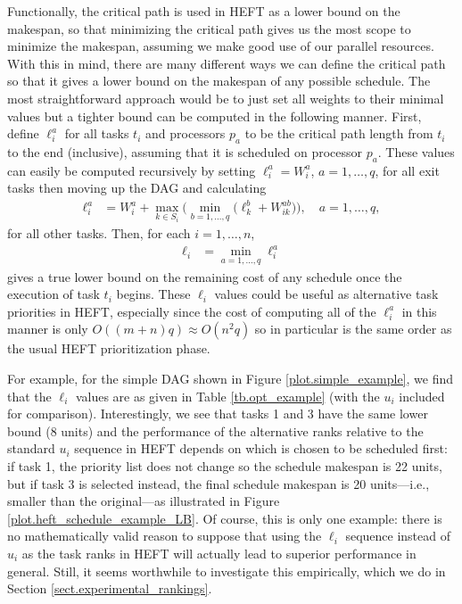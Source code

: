 \documentclass[12pt]{article}
\begin{document}
Functionally, the critical path is used in HEFT as a lower bound on the makespan, so that minimizing the critical path gives us the most scope to minimize the makespan, assuming we make good use of our parallel resources. With this in mind, there are many different ways we can define the critical path so that it gives a lower bound on the makespan of any possible schedule. The most straightforward approach would be to just set all weights to their minimal values but a tighter bound can be computed in the following manner. First, define $\ell_i^a$ for all tasks $t_i$ and processors $p_a$ to be the critical path length from $t_i$ to the end (inclusive), assuming that it is scheduled on processor $p_a$. These values can easily be computed recursively by setting $\ell_i^a = W_i^a$, $a = 1, \dots, q$, for all exit tasks then moving up the DAG and calculating 
\begin{align}
\ell_i^a &= W_i^a + \max_{k \in S_i} \bigg( \min_{b = 1, \dots, q} \big( \ell_k^b + W_{ik}^{ab} \big)  \bigg), \quad a = 1, \dots, q, \label{eq.opt_uia} 
\end{align}
for all other tasks. Then, for each $i = 1, \dots, n$,
\begin{align}
\ell_i &= \min_{a = 1, \dots, q}\ell_i^a \label{eq.opt_ui} 
\end{align}
gives a true lower bound on the remaining cost of any schedule once the execution of task $t_i$ begins. These $\ell_i$ values could be useful as alternative task priorities in HEFT, especially since the cost of computing all of the $\ell_i^a$ in this manner is only $O((m + n)q) \approx O(n^2q)$ so in particular is the same order as the usual HEFT prioritization phase. 

For example, for the simple DAG shown in Figure \ref{plot.simple_example}, we find that the $\ell_i$ values are as given in Table \ref{tb.opt_example} (with the $u_i$ included for comparison). Interestingly, we see that tasks 1 and 3 have the same lower bound (8 units) and the performance of the alternative ranks relative to the standard $u_i$ sequence in HEFT depends on which is chosen to be scheduled first: if task 1, the priority list does not change so the schedule makespan is 22 units, but if task 3 is selected instead, the final schedule makespan is 20 units---i.e., smaller than the original---as illustrated in Figure \ref{plot.heft_schedule_example_LB}. Of course, this is only one example: there is no mathematically valid reason to suppose that using the $\ell_i$ sequence instead of $u_i$ as the task ranks in HEFT will actually lead to superior performance in general. Still, it seems worthwhile to investigate this empirically, which we do in Section \ref{sect.experimental_rankings}.
\end{document}
